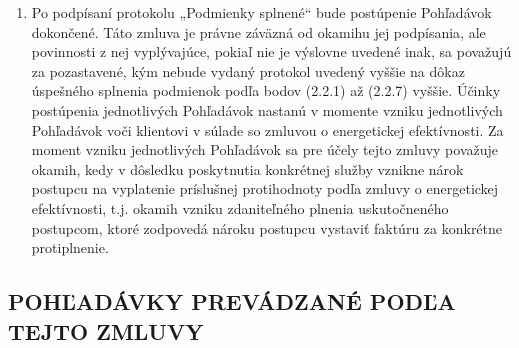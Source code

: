 \documentclass[a4paper]{article}
\begin{document}
\begin{enumerate}
\begin{enumerate}
  \end{enumerate}

\item{Po podpísaní protokolu „Podmienky splnené“ bude postúpenie Pohľadávok dokončené. Táto zmluva je právne záväzná od okamihu jej podpísania, ale povinnosti z nej vyplývajúce, pokiaľ nie je výslovne uvedené inak, sa považujú za pozastavené, kým nebude vydaný protokol uvedený vyššie na dôkaz úspešného splnenia podmienok podľa bodov (2.2.1) až (2.2.7) vyššie. Účinky postúpenia jednotlivých Pohľadávok nastanú v momente vzniku jednotlivých Pohľadávok voči klientovi v súlade so zmluvou o energetickej efektívnosti. Za moment vzniku jednotlivých Pohľadávok sa pre účely tejto zmluvy považuje okamih, kedy v dôsledku poskytnutia konkrétnej služby vznikne nárok postupcu na vyplatenie príslušnej protihodnoty podľa zmluvy o energetickej efektívnosti, t.j. okamih vzniku zdaniteľného plnenia uskutočneného postupcom, ktoré zodpovedá nároku postupcu vystaviť faktúru za konkrétne protiplnenie.}

\end{enumerate}

\subsection{POHĽADÁVKY PREVÁDZANÉ PODĽA TEJTO ZMLUVY}
\end{document}
